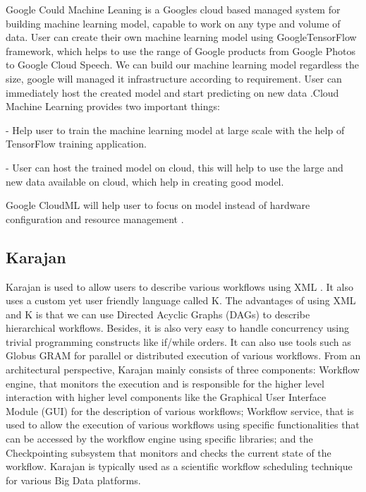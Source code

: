      Google Could Machine Leaning is a Googles cloud based managed
     system for building machine learning model, capable to work on any
     type and volume of data. User can create their own machine learning
     model using GoogleTensorFlow framework, which helps to use the
     range of Google products from Google Photos to Google Cloud Speech.
     We can build our machine learning model regardless the size, google
     will managed it infrastructure according to  requirement. User can
     immediately host the created model and start predicting on new data
     \cite{www-googlecloudmachinelearning}.Cloud Machine Learning provides
     two important things:
     
     - Help user to train the machine learning model at large scale
       with the help of TensorFlow  training application.
	
     - User can host the trained model on cloud,  this will help
       to use the large and new data available on cloud, which help in
       creating good model.

     Google CloudML will help user to focus on model instead of hardware
     configuration and resource management \cite{www-googlecloudoverview}.

\subsection{ Karajan}

     Karajan is used to allow users to describe various workflows
     using XML \cite{RMBDP-Book-1}.  It also uses a custom yet user
     friendly language called K.  The advantages of using XML and K is
     that we can use Directed Acyclic Graphs (DAGs) to describe
     hierarchical workflows.  Besides, it is also very easy to handle
     concurrency using trivial programming constructs like if/while
     orders.  It can also use tools such as Globus GRAM for parallel
     or distributed execution of various workflows.  From an
     architectural perspective, Karajan mainly consists of three
     components: Workflow engine, that monitors the execution and is
     responsible for the higher level interaction with higher level
     components like the Graphical User Interface Module (GUI) for the
     description of various workflows; Workflow service, that is used
     to allow the execution of various workflows using specific
     functionalities that can be accessed by the workflow engine using
     specific libraries; and the Checkpointing subsystem that monitors
     and checks the current state of the workflow.  Karajan is
     typically used as a scientific workflow scheduling technique for
     various Big Data platforms.

